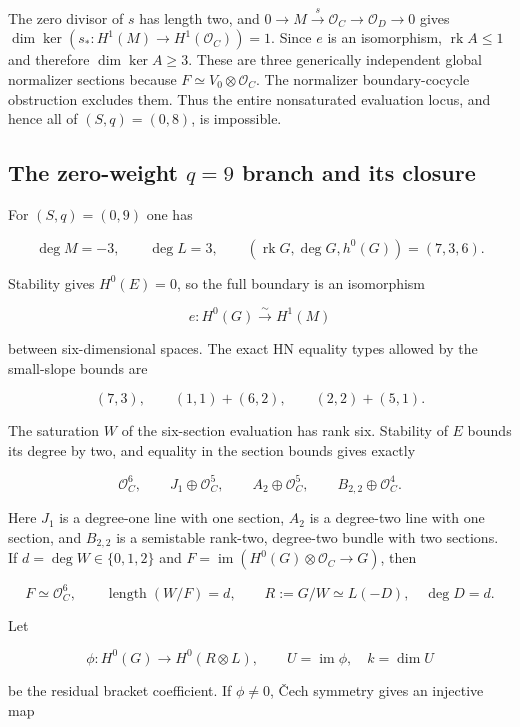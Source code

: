 \documentclass[11pt]{article}
\theoremstyle{definition}
\begin{document}
The zero divisor of \(s\) has length two, and
\(0\to M\xrightarrow{s}\mathcal O_C\to\mathcal O_D\to0\) gives
\(\dim\ker(s_*:H^1(M)\to H^1(\mathcal O_C))=1\). Since \(e\) is an
isomorphism, \(\operatorname{rk}A\le1\) and therefore
\(\dim\ker A\ge3\). These are three generically independent global
normalizer sections because \(F\simeq V_0\otimes\mathcal O_C\). The
normalizer boundary-cocycle obstruction excludes them. Thus the entire
nonsaturated evaluation locus, and hence all of \((S,q)=(0,8)\), is
impossible.

\subsection{\texorpdfstring{The zero-weight \(q=9\) branch and its
closure}{The zero-weight q=9 branch and its closure}}\label{the-zero-weight-q9-branch-and-its-closure}

For \((S,q)=(0,9)\) one has

\[\deg M=-3,\qquad \deg L=3,\qquad
(\operatorname{rk}G,\deg G,h^0(G))=(7,3,6).\]

Stability gives \(H^0(E)=0\), so the full boundary is an isomorphism

\[e:H^0(G)\xrightarrow{\sim}H^1(M)\]

between six-dimensional spaces. The exact HN equality types allowed by
the small-slope bounds are

\[(7,3),\qquad (1,1)+(6,2),\qquad (2,2)+(5,1).\]

The saturation \(W\) of the six-section evaluation has rank six.
Stability of \(E\) bounds its degree by two, and equality in the section
bounds gives exactly

\[\mathcal O_C^6,\qquad
J_1\oplus\mathcal O_C^5,\qquad
A_2\oplus\mathcal O_C^5,\qquad
B_{2,2}\oplus\mathcal O_C^4.\]

Here \(J_1\) is a degree-one line with one section, \(A_2\) is a
degree-two line with one section, and \(B_{2,2}\) is a semistable
rank-two, degree-two bundle with two sections. If
\(d=\deg W\in\{0,1,2\}\) and
\(F=\operatorname{im}(H^0(G)\otimes\mathcal O_C\to G)\), then

\[F\simeq\mathcal O_C^6,\qquad
\operatorname{length}(W/F)=d,
\qquad R:=G/W\simeq L(-D),\quad \deg D=d.\]

Let

\[\phi:H^0(G)\longrightarrow H^0(R\otimes L),
\qquad U=\operatorname{im}\phi,\quad k=\dim U\]

be the residual bracket coefficient. If \(\phi\ne0\), \v{C}ech symmetry
gives an injective map
\end{document}
